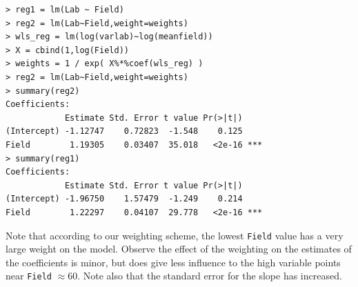 \documentclass{homework}
\begin{document}
\begin{longproblem}
\begin{solution}
\begin{minipage}{.5\textwidth}
{\small
\begin{verbatim}
> reg1 = lm(Lab ~ Field)
> reg2 = lm(Lab~Field,weight=weights) 
> wls_reg = lm(log(varlab)~log(meanfield))
> X = cbind(1,log(Field))
> weights = 1 / exp( X%*%coef(wls_reg) )
> reg2 = lm(Lab~Field,weight=weights)
> summary(reg2) 
Coefficients:
            Estimate Std. Error t value Pr(>|t|)    
(Intercept) -1.12747    0.72823  -1.548    0.125    
Field        1.19305    0.03407  35.018   <2e-16 ***
> summary(reg1)
Coefficients:
            Estimate Std. Error t value Pr(>|t|)    
(Intercept) -1.96750    1.57479  -1.249    0.214    
Field        1.22297    0.04107  29.778   <2e-16 ***
\end{verbatim}
}
\end{minipage}
\begin{minipage}{.5\textwidth}
\vspace{-2cm}
Note that according to our weighting scheme, the lowest \texttt{Field} value
has a very large weight on the model.  Observe the effect of the weighting on the
estimates of the coefficients is minor, but does give less influence to the  high variable points
near \texttt{Field} $\approx 60$.  Note also that the standard error for the slope has increased.
\end{minipage}
\end{solution}



\end{longproblem}
\end{document}
